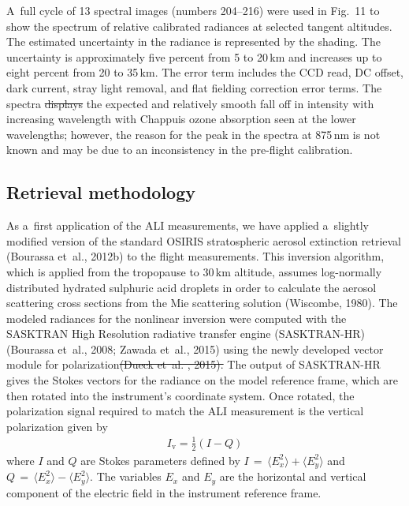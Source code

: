 \documentclass[amtd, online, hvmath]{copernicus}
\providecommand{\DIFadd}[1]{{\protect\color{blue}\uwave{#1}}} %
\providecommand{\DIFdel}[1]{{\protect\color{red}\sout{#1}}}                      %
\providecommand{\DIFaddbegin}{} %
\providecommand{\DIFaddend}{} %
\providecommand{\DIFdelbegin}{} %
\providecommand{\DIFdelend}{} %
\begin{document}
A~full cycle of 13 spectral images (numbers 204--216) were used in Fig.~11 to
show the spectrum of relative calibrated radiances at selected tangent
altitudes. The estimated uncertainty in the radiance is represented by the
shading. The uncertainty is approximately five percent from 5 to
20\,\unit{km} and increases up to eight percent from 20 to 35\,\unit{km}. The
error term includes the CCD read, DC offset, dark current, stray light
removal, and flat fielding correction error terms. The spectra \DIFdelbegin \DIFdel{displays }\DIFdelend \DIFaddbegin \DIFadd{display }\DIFaddend the
expected and relatively smooth fall off in intensity with increasing
wavelength with Chappuis ozone absorption seen at the lower wavelengths;
however, the reason for the peak in the spectra at 875\,\unit{nm} is not
known and may be due to an inconsistency in the pre-flight calibration.

\subsection{Retrieval methodology}

As a~first application of the ALI measurements, we have applied
a~slightly modified version of the standard OSIRIS stratospheric
aerosol extinction retrieval (Bourassa et~al., 2012b) to the flight
measurements. This inversion algorithm, which is applied from the
tropopause to 30\,\unit{km} altitude, assumes log-normally distributed
hydrated sulphuric acid droplets in order to calculate the aerosol
scattering cross sections from the Mie scattering solution (Wiscombe,
1980). The modeled radiances for the nonlinear inversion were computed
with the SASKTRAN High Resolution radiative transfer engine
(SASKTRAN-HR) (Bourassa et~al., 2008; Zawada et~al., 2015) using the
newly developed vector module for polarization\DIFdelbegin \DIFdel{(Dueck et~al. ,
2015). }\DIFdelend \DIFaddbegin \DIFadd{. }\DIFaddend The output of SASKTRAN-HR gives the Stokes vectors for the
radiance on the model reference frame, which are then rotated into the
instrument's coordinate system. Once rotated, the polarization signal
required to match the ALI measurement is the vertical polarization
given by
\begin{align}
I_{\mathrm{v}}=\frac{1}{2}\left(I-Q \right)
\end{align}
where $I$ and $Q$ are Stokes parameters defined by $I\,=\,\langle
E_x^2\rangle + \langle E_y^2\rangle$ and $Q\,=\,\langle E_x^2\rangle -
\langle E_y^2\rangle$. The variables $E_{x}$ and $E_{y}$ are the
horizontal and vertical component of the electric field in the
instrument reference frame.
\end{document}
